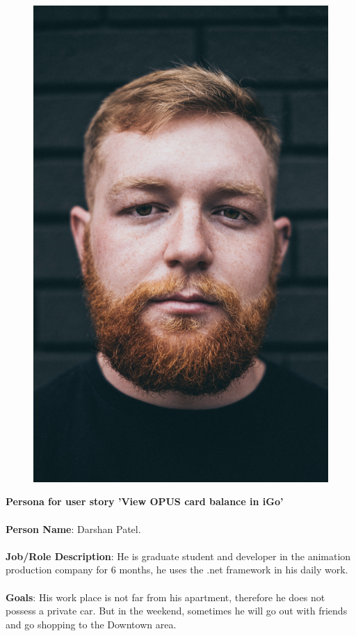 \documentclass[11pt, english]{report}
\begin{document}
\begin{figure}
\includegraphics[width=0.9\linewidth]{images/man_developer.jpg} 
\label{fig:wrapfig}
\end{figure}
\textbf{Persona for user story 'View OPUS card balance in iGo'}
\\\\
\textbf{Person Name}: Darshan Patel. 
\\\\
\textbf{Job/Role Description}: He is graduate student and developer in the animation production company for 6 months, he uses the .net framework in his daily work.
\\\\
\textbf{Goals}: His work place is not far from his apartment, therefore he does not possess a private car. But in the weekend, sometimes he will go out with friends and go shopping to the Downtown area. 
\end{document}
